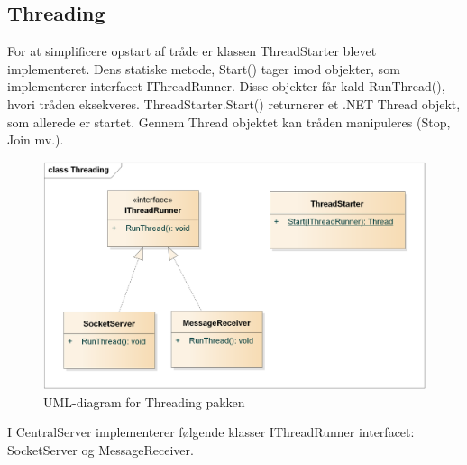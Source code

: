 \subsection{Threading}
For at simplificere opstart af tråde er klassen ThreadStarter blevet implementeret. Dens statiske metode, Start() tager imod objekter, som implementerer interfacet IThreadRunner. Disse objekter får kald RunThread(), hvori tråden eksekveres. ThreadStarter.Start() returnerer et .NET Thread objekt, som allerede er startet. Gennem Thread objektet kan tråden manipuleres (Stop, Join mv.).

\begin{figure}[H]
    \centering
    \includegraphics[width=1\textwidth]{Systemdesign/CentralServer/Images/Threading.png}
    \caption{UML-diagram for Threading pakken}
    \label{fig:CSThreading}
\end{figure}

I CentralServer implementerer følgende klasser IThreadRunner interfacet: SocketServer og MessageReceiver.